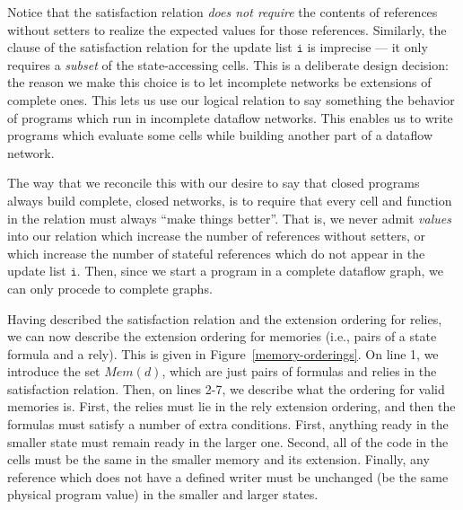 \documentclass[nocopyrightspace,preprint]{sigplanconf}
\newcommand{\term}[1]{\ensuremath{\mathtt{{#1}}}}
\newcommand{\Mem}[1]{\mathit{Mem}(#1)}
\begin{document}
Notice that the satisfaction relation \emph{does not require} the
contents of references without setters to realize the expected values
for those references. Similarly, the clause of the satisfaction
relation for the update list \term{i} is imprecise --- it only
requires a \emph{subset} of the state-accessing cells. This is a
deliberate design decision: the reason we make this choice is to let
incomplete networks be extensions of complete ones. This lets us use
our logical relation to say something the behavior of programs which
run in incomplete dataflow networks. This enables us to write programs
which evaluate some cells while building another part of a dataflow
network.

The way that we reconcile this with our desire to say that closed
programs always build complete, closed networks, is to require that
every cell and function in the relation must always ``make things
better''. That is, we never admit \emph{values} into our relation which
increase the number of references without setters, or which increase
the number of stateful references which do not appear in the update
list \term{i}. Then, since we start a program in a complete dataflow
graph, we can only procede to complete graphs. 

Having described the satisfaction relation and the extension ordering
for relies, we can now describe the extension ordering for memories
(i.e., pairs of a state formula and a rely). This is given in
Figure~\ref{memory-orderings}. On line 1, we introduce the set
$\Mem{d}$, which are just pairs of formulas and relies in the
satisfaction relation. Then, on lines 2-7, we describe what the
ordering for valid memories is. First, the relies must lie in the rely
extension ordering, and then the formulas must satisfy a number of
extra conditions. First, anything ready in the smaller state must
remain ready in the larger one. Second, all of the code in the cells
must be the same in the smaller memory and its extension.  Finally,
any reference which does not have a defined writer must be unchanged
(be the same physical program value) in the smaller and larger states.
\end{document}
